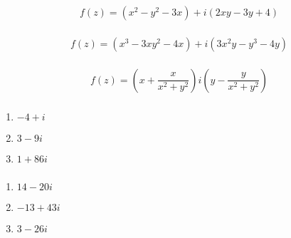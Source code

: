 \documentclass{article}
\begin{document}
\setcounter{subsubsection}{8}
\subsubsection{}

\[f(z) = (x^2 - y^2 - 3 x) + i (2 x y - 3 y + 4)\]

\setcounter{subsubsection}{10}
\subsubsection{}

\[f(z) = (x^3 - 3 x y^2 - 4 x) + i (3 x^2 y - y^3 - 4 y)\]

\setcounter{subsubsection}{12}
\subsubsection{}

\[f(z) = \left( x + \frac{x}{x^2 + y^2} \right) i \left( y - \frac{y}{x^2 + y^2} \right)\]

\setcounter{subsubsection}{14}
\subsubsection{}

\begin{enumerate}
  \item $-4 + i$

  \item $3 - 9 i$

  \item $1 + 86 i$
\end{enumerate}

\setcounter{subsubsection}{16}
\subsubsection{}

\begin{enumerate}
  \item $14 - 20 i$

  \item $-13 + 43 i$

  \item $3 - 26 i$
\end{enumerate}

\setcounter{subsubsection}{18}
\subsubsection{}
\end{document}
